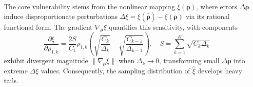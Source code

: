 The core vulnerability stems from the nonlinear mapping $\xi(\boldsymbol{\rho})$, where errors $\Delta \boldsymbol{\rho}$ induce disproportionate perturbations $\Delta\xi = \xi(\widehat {\boldsymbol{\rho}}) - \xi(\boldsymbol{\rho})$ via its rational functional form. The gradient $\nabla_{\boldsymbol{\rho}} \xi$ quantifies this sensitivity, with components
%
\[
\frac{\partial \xi}{\partial \rho_{1,k}} = \frac{2S}{C_1}\rho_{1,k}\left(\sqrt{\frac{C_k}{\Delta_k }} - \sqrt{\frac{C_{k-1}}{\Delta_{k-1} }}\right), \quad S = \sum_{k=1}^K\sqrt{C_k\Delta_k }
\]
%
exhibit divergent magnitude $\|\nabla_{\boldsymbol{\rho}} \xi\|$ when $\Delta_k \to 0$, transforming small $\Delta \boldsymbol{\rho}$ into extreme $\Delta\xi$ values. Consequently, the sampling distribution of $\widehat{\xi}$ develops heavy tails.




